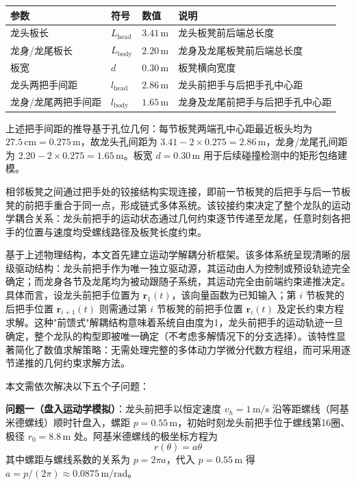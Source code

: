 \documentclass{mcmthesis}
\begin{document}
\begin{table}[htbp]
\centering
\begin{tabular}{l l l l}
\toprule
参数 & 符号 & 数值 & 说明 \\
\midrule
龙头板长 & $L_{\text{head}}$ & $3.41\,\text{m}$ & 龙头板凳前后端总长度 \\
龙身/龙尾板长 & $L_{\text{body}}$ & $2.20\,\text{m}$ & 龙身及龙尾板凳前后端总长度 \\
板宽 & $d$ & $0.30\,\text{m}$ & 板凳横向宽度 \\
龙头两把手间距 & $l_{\text{head}}$ & $2.86\,\text{m}$ & 龙头前把手与后把手孔中心距 \\
龙身/龙尾两把手间距 & $l_{\text{body}}$ & $1.65\,\text{m}$ & 龙身及龙尾前把手与后把手孔中心距 \\
\bottomrule
\end{tabular}
\end{table}

上述把手间距的推导基于孔位几何：每节板凳两端孔中心距最近板头均为 $27.5\,\text{cm}=0.275\,\text{m}$，故龙头孔间距为 $3.41 - 2\times0.275 = 2.86\,\text{m}$，龙身/龙尾孔间距为 $2.20 - 2\times0.275 = 1.65\,\text{m}$。板宽 $d=0.30\,\text{m}$ 用于后续碰撞检测中的矩形包络建模。

相邻板凳之间通过把手处的铰接结构实现连接，即前一节板凳的后把手与后一节板凳的前把手重合于同一点，形成链式多体系统。该铰接约束决定了整个龙队的运动学耦合关系：龙头前把手的运动状态通过几何约束逐节传递至龙尾，任意时刻各把手的位置与速度均受螺线路径及板凳长度约束。

基于上述物理结构，本文首先建立运动学解耦分析框架。该多体系统呈现清晰的层级驱动结构：龙头前把手作为唯一独立驱动源，其运动由人为控制或预设轨迹完全确定；而龙身各节及龙尾均为被动跟随子系统，其运动完全由前端约束递推决定。具体而言，设龙头前把手位置为 $\boldsymbol{r}_1(t)$，该向量函数为已知输入；第 $i$ 节板凳的后把手位置 $\boldsymbol{r}_{i+1}(t)$ 则需通过第 $i$ 节板凳的前把手位置 $\boldsymbol{r}_i(t)$ 及定长约束方程求解。这种"前馈式"解耦结构意味着系统自由度为1，龙头前把手的运动轨迹一旦确定，整个龙队的构型即被唯一确定（不考虑多解情况下的分支选择）。该特性显著简化了数值求解策略：无需处理完整的多体动力学微分代数方程组，而可采用逐节递推的几何约束求解方法。

本文需依次解决以下五个子问题：

\textbf{问题一（盘入运动学模拟）}：龙头前把手以恒定速度 $v_h = 1\,\text{m/s}$ 沿等距螺线（阿基米德螺线）顺时针盘入，螺距 $p = 0.55\,\text{m}$，初始时刻龙头前把手位于螺线第16圈、极径 $r_0 = 8.8\,\text{m}$ 处。阿基米德螺线的极坐标方程为
\begin{equation}
r(\theta) = a\theta
\end{equation}
其中螺距与螺线系数的关系为 $p = 2\pi a$，代入 $p = 0.55\,\text{m}$ 得 $a = p/(2\pi) \approx 0.0875\,\text{m/rad}$。
\end{document}

